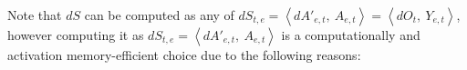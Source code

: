 








Note that $dS$ can be computed as any of $dS_{t,e}=\left\langle dA'_{e,t},\ A_{e,t}\right\rangle = \left\langle dO_t,\ Y_{e,t}\right\rangle$, however computing it as $dS_{t,e}=\left\langle dA'_{e,t},\ A_{e,t}\right\rangle$ is a computationally and activation memory-efficient choice due to the following reasons:


